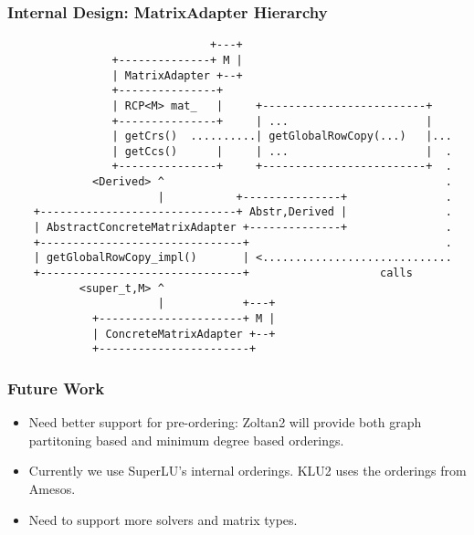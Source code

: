 \documentclass[xcolor=dvipsnames]{beamer}
\begin{document}
\begin{frame}
  \frametitle{Internal Design: MatrixAdapter Hierarchy}
\begin{center}
\begin{verbatim}        
                               +---+
                +--------------+ M |
                | MatrixAdapter +--+
                +---------------+        
                | RCP<M> mat_   |     +-------------------------+
                +---------------+     | ...                     |
                | getCrs()  ..........| getGlobalRowCopy(...)   |...
                | getCcs()      |     | ...                     |  .
                +---------------+     +-------------------------+  .
             <Derived> ^                                           .
                       |           +---------------+               .
    +------------------------------+ Abstr,Derived |               .
    | AbstractConcreteMatrixAdapter +--------------+               .
    +-------------------------------+                              .
    | getGlobalRowCopy_impl()       | <.............................
    +-------------------------------+                    calls
           <super_t,M> ^
                       |            +---+
             +----------------------+ M |
             | ConcreteMatrixAdapter +--+
             +-----------------------+
\end{verbatim}
\end{center}
\end{frame}

\begin{frame}
  \frametitle{Future Work}
  \begin{itemize}
  \item Need better support for pre-ordering: Zoltan2 will provide
    both graph partitoning based and minimum degree based orderings.
  \item Currently we use SuperLU's internal orderings. KLU2 uses the
    orderings from Amesos.
  \item Need to support more solvers and matrix types.
  \end{itemize}
\end{frame}
\end{document}

